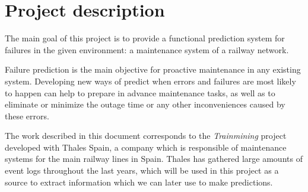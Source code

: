 \section{Project description}
The  main goal of this project is to provide a functional prediction system for failures in the given environment: a maintenance system of a railway network.

Failure prediction is the main objective for proactive maintenance in any existing system. Developing new ways of predict when errors and failures are most likely to happen can help to prepare in advance maintenance tasks, as well as to eliminate or minimize the outage time or any other inconveniences caused by these errors.

The work described in this document corresponds to the \emph{Trainmining} project developed with Thales Spain, a company which is responsible of maintenance systems for the main railway lines in Spain. Thales has gathered large amounts of event logs throughout the last years, which will be used in this project as a source to extract information which we can later use to make predictions.